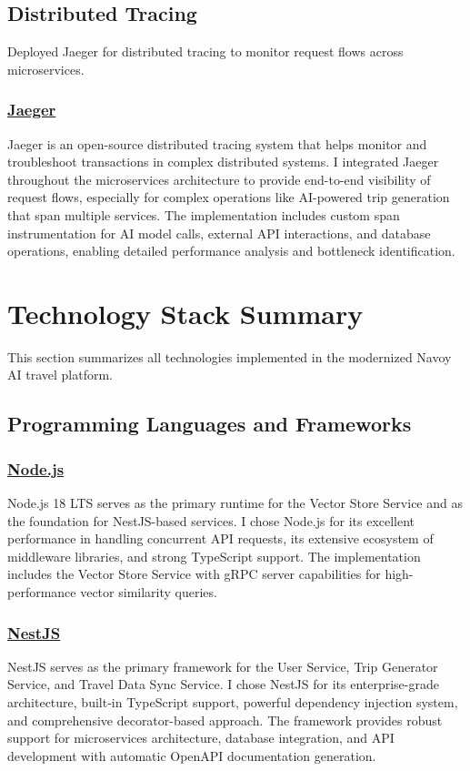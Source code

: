 \subsection{Distributed Tracing}
Deployed Jaeger for distributed tracing to monitor request flows across microservices.

\subsubsection*{\underline{Jaeger}}
Jaeger is an open-source distributed tracing system that helps monitor and troubleshoot transactions in complex distributed systems. I integrated Jaeger throughout the microservices architecture to provide end-to-end visibility of request flows, especially for complex operations like AI-powered trip generation that span multiple services. The implementation includes custom span instrumentation for AI model calls, external API interactions, and database operations, enabling detailed performance analysis and bottleneck identification.

\section{Technology Stack Summary}
This section summarizes all technologies implemented in the modernized Navoy AI travel platform.

\subsection{Programming Languages and Frameworks}

\subsubsection*{\underline{Node.js}}
Node.js 18 LTS serves as the primary runtime for the Vector Store Service and as the foundation for NestJS-based services. I chose Node.js for its excellent performance in handling concurrent API requests, its extensive ecosystem of middleware libraries, and strong TypeScript support. The implementation includes the Vector Store Service with gRPC server capabilities for high-performance vector similarity queries.

\subsubsection*{\underline{NestJS}}
NestJS serves as the primary framework for the User Service, Trip Generator Service, and Travel Data Sync Service. I chose NestJS for its enterprise-grade architecture, built-in TypeScript support, powerful dependency injection system, and comprehensive decorator-based approach. The framework provides robust support for microservices architecture, database integration, and API development with automatic OpenAPI documentation generation.

